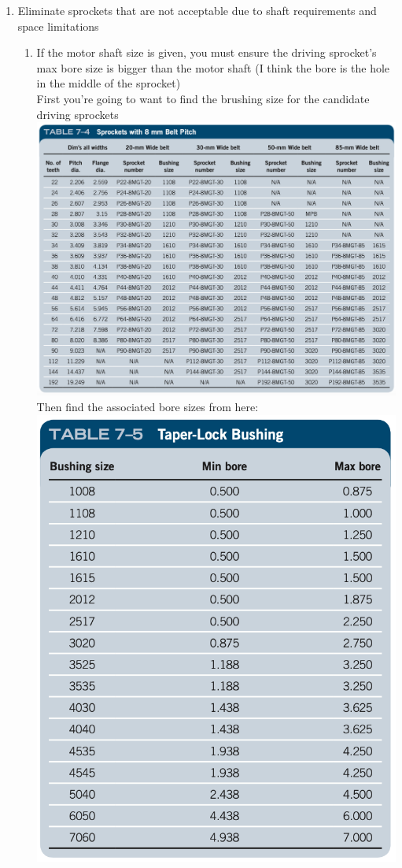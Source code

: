 \documentclass[11pt, fleqn]{article}
\begin{document}
\begin{enumerate}
    \item Eliminate sprockets that are not acceptable due to shaft requirements and space limitations
    \begin{enumerate}
        \item If the motor shaft size is given, you must ensure the driving sprocket's max bore size is bigger than the motor shaft (I think the bore is the hole in the middle of the sprocket)\\
        First you're going to want to find the brushing size for the candidate driving sprockets\\
        \includegraphics[scale=0.45]{Belts/7-4.png}\\
        Then find the associated bore sizes from here:\\
        \includegraphics[scale=0.6]{Belts/7-5.png}\\

\end{enumerate}
\end{enumerate}
\end{document}
